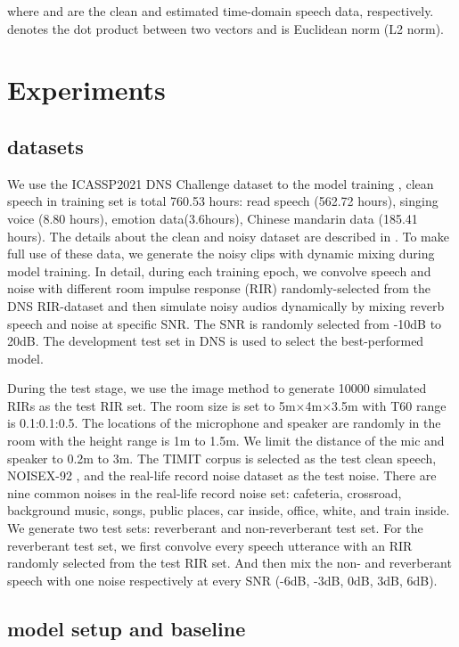 \documentclass[journal,10pt]{IEEEtran}
\begin{document}
where  and  are the clean and estimated time-domain speech data, respectively.  denotes the dot product between two vectors and  is Euclidean norm (L2 norm).

\section{Experiments}
\label{sec:experiments}
\subsection{datasets}

We use the ICASSP2021 DNS Challenge dataset to the model training \cite{reddy2020icassp}, clean speech in training set is total 760.53 hours: read speech (562.72 hours), singing voice (8.80 hours), emotion data(3.6hours), Chinese mandarin data (185.41 hours). The details about the clean and noisy dataset are described in \cite{reddy2020interspeechresults}. To make full use of these data,  we generate the noisy clips with dynamic mixing during model training. In detail, during each training epoch, we convolve speech and noise with different room impulse response (RIR) randomly-selected from the DNS RIR-dataset and then simulate noisy audios dynamically by mixing reverb speech and noise at specific SNR. The SNR is randomly selected from -10dB to 20dB. The development test set in DNS is used to select the best-performed model.

During the test stage, we use the image method \cite{allen1979image} to generate 10000 simulated RIRs as the test RIR set. The room size is set to 5m×4m×3.5m with T60 range is 0.1:0.1:0.5. The locations of the microphone and speaker are randomly in the room with the height range is 1m to 1.5m. We limit the distance of the mic and speaker to 0.2m to 3m. The TIMIT corpus \cite{garofolo1993darpa} is selected as the test clean speech, NOISEX-92 \cite{varga1993assessment}, and the real-life record noise dataset as the test noise. There are nine common noises in the real-life record noise set: cafeteria, crossroad, background music, songs, public places, car inside, office, white, and train inside. We generate two test sets: reverberant and non-reverberant test set. For the reverberant test set, we first convolve every speech utterance with an RIR randomly selected from the test RIR set. And then mix the non- and reverberant speech with one noise respectively at every SNR (-6dB, -3dB, 0dB, 3dB, 6dB).

\subsection{model setup and baseline}
\end{document}
